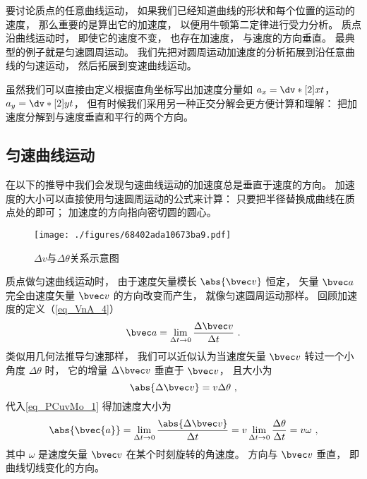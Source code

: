 

要讨论质点的任意曲线运动， 如果我们已经知道曲线的形状和每个位置的运动的速度， 那么重要的是算出它的加速度， 以便用牛顿第二定律进行受力分析。 质点沿曲线运动时， 即使它的速度不变， 也存在加速度， 与速度的方向垂直。 最典型的例子就是匀速圆周运动。 我们先把对圆周运动加速度的分析拓展到沿任意曲线的匀速运动， 然后拓展到变速曲线运动。

虽然我们可以直接由定义根据直角坐标写出加速度分量如 $a_x = \dv*[2]{x}{t}$， $a_y = \dv*[2]{y}{t}$， 但有时候我们采用另一种正交分解会更方便计算和理解： 把加速度分解到与速度垂直和平行的两个方向。

\subsection{匀速曲线运动}
在以下的推导中我们会发现匀速曲线运动的加速度总是垂直于速度的方向。 加速度的大小可以直接使用匀速圆周运动的公式来计算： 只要把半径替换成曲线在质点处的即可； 加速度的方向指向密切圆的圆心。
\begin{figure}[ht]
\centering
\texttt{[image: ./figures/68402ada10673ba9.pdf]}
\caption{$\Delta v$与$\Delta \theta$关系示意图} \label{fig_PCuvMo_1}
\end{figure}

质点做匀速曲线运动时， 由于速度矢量模长 $\abs{\bvec v}$ 恒定， 矢量 $\bvec a$ 完全由速度矢量 $\bvec v$ 的方向改变而产生， 就像匀速圆周运动那样。 回顾加速度的定义（\autoref{eq_VnA_4}）
\begin{equation}\label{eq_PCuvMo_2}
\bvec a = \lim_{\Delta t \to 0} \frac{\Delta \bvec v}{\Delta t}~.
\end{equation}
类似用几何法推导匀速那样， 我们可以近似认为当速度矢量 $\bvec v$ 转过一个小角度 $\Delta \theta$ 时， 它的增量 $\Delta \bvec v$ 垂直于 $\bvec v$， 且大小为
\begin{equation}\label{eq_PCuvMo_1}
\abs{\Delta \bvec v} = v\Delta\theta~,
\end{equation}
代入\autoref{eq_PCuvMo_1} 得加速度大小为
\begin{equation}\label{eq_PCuvMo_4}
\abs{\bvec{a}} = \lim_{\Delta t \to 0} \frac{\abs{\Delta \bvec v}}{\Delta t}
= v\lim_{\Delta t \to 0}\frac{\Delta \theta}{\Delta t} = v\omega~,
\end{equation}
其中 $\omega$ 是速度矢量 $\bvec v$ 在某个时刻旋转的角速度。 方向与 $\bvec v$ 垂直， 即曲线切线变化的方向。

